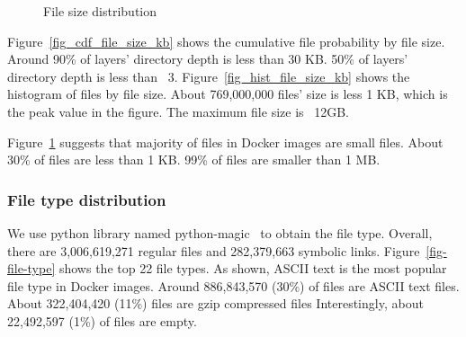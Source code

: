\begin{figure}[!t]
	\centering
	\caption{File size distribution}
	\label{fig-file-size}
\end{figure}

Figure~\ref{fig_cdf_file_size_kb} shows the cumulative file probability by file size. Around 90\% of layers' directory depth is less than 30 KB. 50\% of layers' directory depth is less than ~3. Figure~\ref{fig_hist_file_size_kb} shows the histogram of files by file size. About 769,000,000 files' size is less 1 KB, which is the peak value in the figure. The maximum file size is ~12GB.

Figure~\ref{fig-file-size} suggests that majority of files in Docker images are small files. About 30\% of files are less than 1 KB. 99\% of files are smaller than 1 MB.

\subsubsection{File type distribution}

We use python library named python-magic~\cite{python-magic} to obtain the file type. Overall, there are 3,006,619,271 regular files and 282,379,663 symbolic links. Figure~\ref{fig-file-type} shows the top 22 file types. As shown, ASCII text is the most popular file type in Docker images. Around 886,843,570 (30\%) of files are ASCII text files. 
About 322,404,420 (11\%) files are gzip compressed files 
Interestingly, about 22,492,597 (1\%) of files are empty.  

